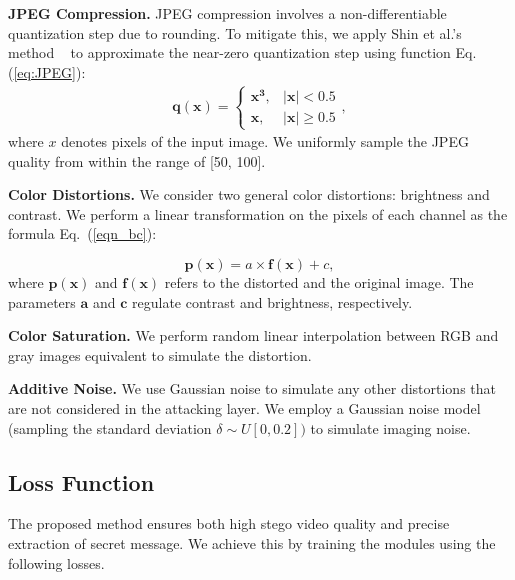\documentclass{article}
\begin{document}
\noindent\textbf{JPEG Compression.} JPEG compression involves a non-differentiable quantization step due to rounding. To mitigate this, we apply Shin et al.'s method ~\cite{shin2017jpeg} to approximate the near-zero quantization step using function Eq. (\ref{eq:JPEG}):
\begin{equation}
\begin{aligned}%
\bm{q(x)} = \left \{
\begin{array}{ll}%
    \bm{x^{3}},                    & \bm{|x| < 0.5}\\
    \bm{x},                           & \bm{|x|\geq 0.5}
\end{array}
\right. ,
\end{aligned}
\label{eq:JPEG}
\end{equation}
where $x$ denotes pixels of the input image.
We uniformly sample the JPEG quality from within the range of [50, 100].

\noindent\textbf{Color Distortions.} We consider two general color distortions: brightness and contrast.
We perform a linear transformation on the pixels of each channel as the formula Eq.~(\ref{eqn_bc}):

\begin{equation}
    \bm{p(x)}=a\times\bm{f(x)}  + c ,
\label{eqn_bc}
\end{equation}
where $\bm{p(x)}$ and $\bm{f(x)}$ refers to the distorted and the original image. The parameters $\bm{a}$ and $\bm{c}$ regulate contrast and brightness, respectively.


\noindent\textbf{Color Saturation.} We perform random linear interpolation between RGB and gray images equivalent to simulate the distortion.

\noindent\textbf{Additive Noise.}
We use Gaussian noise to simulate any other distortions that are not considered in the attacking layer. We employ a Gaussian noise model (sampling the standard deviation $\delta \sim U[0, 0.2])$ to simulate imaging noise.


\subsection{Loss Function} 
The proposed method ensures both high stego video quality and precise extraction of secret message. We achieve this by training the modules using the following losses.
\end{document}

